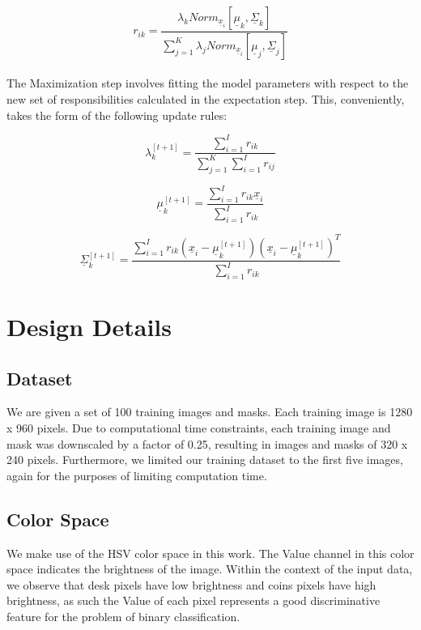 \documentclass[11pt]{article}
\begin{document}
		$$ r_{ik} = \frac{ \lambda_{k}Norm_{\underline{x}_i}[\underline{\mu}_k, \underline{\Sigma}_k]}{\sum_{j=1}^{K} \lambda_{j}Norm_{\underline{x}_i}[\underline{\mu}_j, \underline{\Sigma}_j]}$$
		
		\paragraph{} The Maximization step involves fitting the model parameters with respect to the new set of responsibilities calculated in the expectation step. This, conveniently, takes the form of the following update rules:
		
		$$\lambda^{[t+1]}_{k} = \frac{\sum_{i=1}^{I} r_{ik}}{\sum_{j=1}^{K}\sum_{i=1}^{I} r_{ij}}$$
		
		$$\underline{\mu}^{[t+1]}_{k} = \frac{\sum_{i=1}^{I} r_{ik}\underline{x}_i}{\sum_{i=1}^{I} r_{ik}}$$
				
$$\underline{\Sigma}^{[t+1]}_{k} = \frac{\sum_{i=1}^{I} r_{ik}(\underline{x}_i - \underline{\mu}^{[t+1]}_{k})(\underline{x}_i - \underline{\mu}^{[t+1]}_{k})^{T}}{\sum_{i=1}^{I} r_{ik}}$$
		
	
	\section{Design Details}
	
	\subsection{Dataset}
	
	We are given a set of 100 training images and masks. Each training image is 1280 x 960 pixels. Due to computational time constraints, each training image and mask was downscaled by a factor of 0.25, resulting in images and masks of 320 x 240 pixels.
	Furthermore, we limited our training dataset to the first five images, again for the purposes of limiting computation time. 
	
	\subsection{Color Space} We make use of the HSV color space in this work. The Value channel in this color space indicates the brightness of the image. Within the context of the input data, we observe that desk pixels have low brightness and coins pixels have high brightness, as such the Value of each pixel represents a good discriminative feature for the problem of binary classification. 
	
\end{document}
